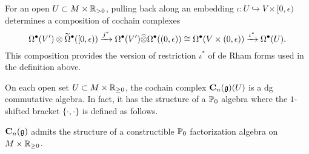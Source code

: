 \documentclass[11pt]{amsart}
\numberwithin{equation}{section}
\begin{document}
\begin{rmk}
For an open $U \subset M \times \mathbb R_{>0}$, pulling back along an embedding $\iota : U \hookrightarrow V \times [0,\epsilon)$ determines a composition of cochain complexes
\[
\Omega^\bullet (V') \otimes \widetilde{\Omega}^\bullet([0,\epsilon)) \xrightarrow{j^*}  \Omega^\bullet (V') \widehat{\otimes} \Omega^\bullet((0,\epsilon)) \cong \Omega^\bullet(V \times (0,\epsilon)) \xrightarrow{\iota^*} \Omega^\bullet(U) .
\]
This composition provides the version of restriction $\iota^*$ of de Rham forms used in the definition above.
\end{rmk}

On each open set $U \subset M \times \mathbb R_{\geq 0}$, the cochain complex $\mathbf C_n(\mathfrak g) (U)$ is a dg commutative algebra. 
In fact, it has the structure of a $\mathbb P_0$ algebra where the $1$-shifted bracket $\{\cdot, \cdot\}$ is defined as follows.

\begin{lmm}
$\mathbf C_n(\mathfrak g)$ admits the structure of a constructible $\mathbb P_0$ factorization algebra on~$M \times \mathbb R_{\geq 0}$. 
\end{lmm}
\end{document}
